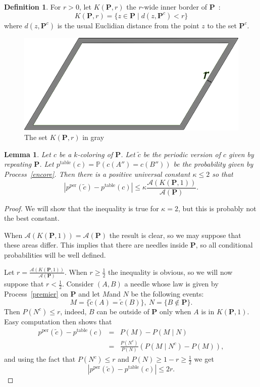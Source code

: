 \documentclass[a4paper,11pt]{article}
\newtheorem{lemma}{Lemma}
\theoremstyle{definition}
\newtheorem{definition}{Definition}
\theoremstyle{remark}
\renewcommand{\Pr}{\mathbb{P}}
\renewcommand{\P}{\mathbf{P}}
\newcommand{\pper}{p^{\mathrm{per}}}
\newcommand{\ptable}{p^{\mathrm{table}}}
\begin{document}
\begin{definition}
For $r>0$, let $K(\mathbf{P},r)$ the $r$-wide inner border of $\mathbf{P}$~:
\[K(\mathbf{P},r) = \{ z \in \mathbf{P} \mid d(z,\mathbf{P}^c) < r\} \]
where $d(z,\mathbf{P}^c)$ is the usual Euclidian distance from the point $z$ to the set $\mathbf{P}^c$.
\end{definition}

\begin{figure}[h]
\center
\includegraphics[scale=0.5]{tablefinie.png}
\caption{\label{tablefinie} The set $K(\mathbf{P},r)$ in gray}
\end{figure}

\begin{lemma}\label{choco}
Let $c$ be a $k$-coloring of $\mathbf{P}$. Let $\tilde{c}$ be the periodic version of
$c$ given by repeating $\P$. Let
$\ptable(c) = \Pr(c(A'')=c(B''))$ be the probability given by Process~\ref{encore}. Then 
there is a positive universal constant $\kappa \leq 2$ so that 
$$ | \pper(\tilde{c}) - \ptable(c)| \leq \kappa \frac{\mathcal{A}(K(\mathbf{P},1))}{\mathcal{A}(\mathbf{P})}.$$
\end{lemma}

\begin{proof}
We will show that the inequality is true for $\kappa =2$, but this is probably 
not the best constant.

When $\mathcal{A}(K(\mathbf{P},1)) = \mathcal{A}(\mathbf{P})$ the result is clear,
so we may suppose that these areas differ. This implies that there are needles 
inside $\P$, so all conditional probabilities will be well defined.

Let $r = \frac{\mathcal{A}(K(\mathbf{P},1))}{\mathcal{A}(\mathbf{P})}$. When 
$r \geq \frac12$ the inequality is obvious, so we will now suppose that 
$r < \frac12$. Consider $(A,B)$ a needle whose law is given by Process~\ref{premier} on $\P$ and let $M$and $N$ be the following events:
$$ M = \{\tilde{c} (A) = \tilde{c} (B) \}, \ N = \{B\notin \P \}.$$
Then $P(N^c) \leq r$, indeed, $B$ can 
be outside of $\mathbf{P}$ only
when $A$ is in $K(\mathbf{P},1)$. Easy computation then shows that
\begin{eqnarray*}
\pper(\tilde{c}) - \ptable(c) & = & P(M) - P(M \mid N) \\
& = & \frac{P(N^c)}{P(N)} \left( P(M\mid N^c) - P(M)\right),
\end{eqnarray*}
and using the fact that $P(N^c) \leq r$ and 
$P(N) \geq 1-r \geq \frac12$ we get 
$$ |\pper(\tilde{c}) - \ptable(c)| \leq 2r.$$
\end{proof}
\end{document}
